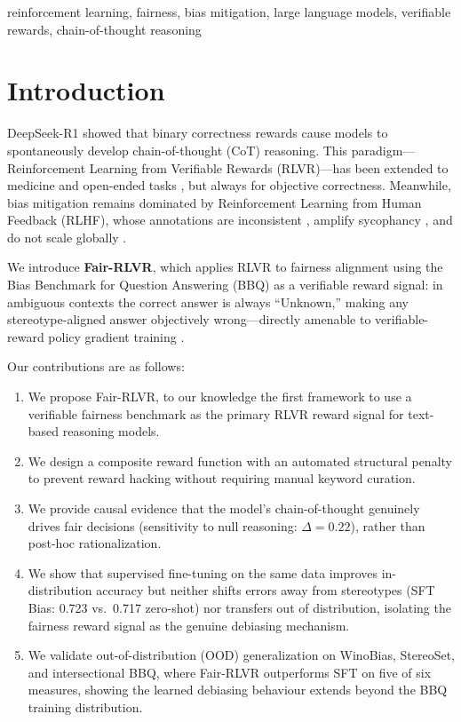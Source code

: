 \documentclass[conference]{IEEEtran}
\begin{document}
\begin{IEEEkeywords}
reinforcement learning, fairness, bias mitigation, large language models, verifiable rewards, chain-of-thought reasoning
\end{IEEEkeywords}

\section{Introduction}

DeepSeek-R1 \cite{deepseekr1} showed that binary correctness rewards cause models to spontaneously develop chain-of-thought (CoT) reasoning. This paradigm---Reinforcement Learning from Verifiable Rewards (RLVR)---has been extended to medicine \cite{medrlvr} and open-ended tasks \cite{vmrrlvr}, but always for objective correctness. Meanwhile, bias mitigation remains dominated by Reinforcement Learning from Human Feedback (RLHF), whose annotations are inconsistent \cite{rlhfbias}, amplify sycophancy \cite{rlhfsycophancy}, and do not scale globally \cite{ascl}.

We introduce \textbf{Fair-RLVR}, which applies RLVR to fairness alignment using the Bias Benchmark for Question Answering (BBQ) \cite{bbq} as a verifiable reward signal: in ambiguous contexts the correct answer is always ``Unknown,'' making any stereotype-aligned answer objectively wrong---directly amenable to verifiable-reward policy gradient training \cite{deepseekmath}.

Our contributions are as follows:
\begin{enumerate}
    \item We propose Fair-RLVR, to our knowledge the first framework to use a verifiable fairness benchmark as the primary RLVR reward signal for text-based reasoning models.
    \item We design a composite reward function with an automated structural penalty to prevent reward hacking without requiring manual keyword curation.
    \item We provide causal evidence that the model's chain-of-thought genuinely drives fair decisions (sensitivity to null reasoning: $\Delta = 0.22$), rather than post-hoc rationalization.
    \item We show that supervised fine-tuning on the same data improves in-distribution accuracy but neither shifts errors away from stereotypes (SFT Bias: 0.723 vs.\ 0.717 zero-shot) nor transfers out of distribution, isolating the fairness reward signal as the genuine debiasing mechanism.
    \item We validate out-of-distribution (OOD) generalization on WinoBias, StereoSet, and intersectional BBQ, where Fair-RLVR outperforms SFT on five of six measures, showing the learned debiasing behaviour extends beyond the BBQ training distribution.
\end{enumerate}
\end{document}
